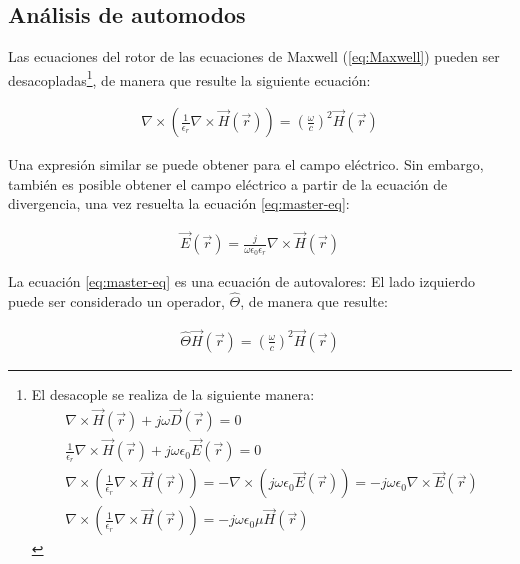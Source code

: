 \subsection{Análisis de automodos}
\label{sec:automodos}

Las ecuaciones del rotor de las ecuaciones de Maxwell (\ref{eq:Maxwell}) pueden ser desacopladas\footnote{El desacople se realiza de la siguiente manera:
	\begin{align*}
		\nabla \times \vec{H}(\vec{r}) + j\omega\vec{D}(\vec{r}) = 0 \\
		\frac{1}{\epsilon_r} \nabla \times \vec{H}(\vec{r}) + j\omega\epsilon_0\vec{E}(\vec{r}) = 0 \\
		\nabla \times \left(\frac{1}{\epsilon_r} \nabla \times \vec{H}(\vec{r})\right)= - \nabla \times (j\omega\epsilon_0\vec{E}(\vec{r})) = -j \omega\epsilon_0 \nabla \times \vec{E}(\vec{r}) \\
		\nabla \times \left(\frac{1}{\epsilon_r} \nabla \times \vec{H}(\vec{r})\right) = -j \omega\epsilon_0 \mu \vec{H}(\vec{r})
	\end{align*}
	
	}, de manera que resulte la siguiente ecuación:
	
	\begin{align}
		\label{eq:master-eq}
		\nabla \times \left(\frac{1}{\epsilon_r} \nabla \times \vec{H}(\vec{r}) \right) = \left(\frac{\omega}{c}\right)^2 \vec{H}(\vec{r})
	\end{align}

Una expresión similar se puede obtener para el campo eléctrico. Sin embargo, también es posible obtener el campo eléctrico a partir de la ecuación de divergencia, una vez resuelta la ecuación \ref{eq:master-eq}:

\begin{align}
	\vec{E}(\vec{r}) = \frac{j}{\omega \epsilon_0 \epsilon_r} \nabla \times \vec{H}(\vec{r})
\end{align}

La ecuación \ref{eq:master-eq} es una ecuación de autovalores: El lado izquierdo puede ser considerado un operador, $\hat{\Theta}$, de manera que resulte:

\begin{align}
	\hat{\Theta} \vec{H}(\vec{r}) = \left(  \frac{\omega}{c} \right)^2 \vec{H}(\vec{r})
\end{align}

